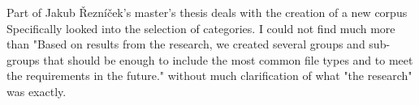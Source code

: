 Part of Jakub Řezníček's master's thesis deals with the creation of a new corpus \cite[Ch 4 \& Appendix A]{jakubˇreznicek2010corpus}
Specifically looked into the selection of categories. I could not find much more than "Based on results from the research, we created several groups and sub-groups that should be enough to include the most common file types and to meet the requirements in the future."\cite{jakubˇreznicek2010corpus} without much clarification of what "the research" was exactly. 
